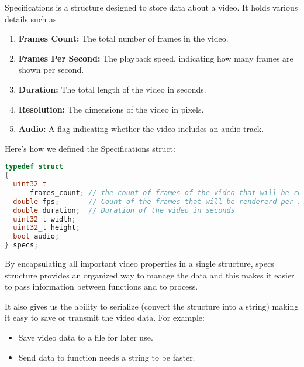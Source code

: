 \documentclass[a4paper,12pt]{article}
\begin{document}
Specifications is a structure designed to store data about a video. It holds various details such as

\begin{enumerate}
    \item \textbf{Frames Count:} The total number of frames in the video.
    \item \textbf{Frames Per Second:} The playback speed, indicating how many frames are shown per second.
    \item \textbf{Duration:} The total length of the video in seconds.
    \item \textbf{Resolution:} The dimensions of the video in pixels.
    \item \textbf{Audio:} A flag indicating whether the video includes an audio track.
\end{enumerate}

Here's how we defined the Specifications struct:
\begin{lstlisting}[language=c]
typedef struct
{
  uint32_t
      frames_count; // the count of frames of the video that will be rendererd
  double fps;       // Count of the frames that will be rendererd per second
  double duration;  // Duration of the video in seconds
  uint32_t width;
  uint32_t height;
  bool audio;
} specs;
\end{lstlisting}

By encapsulating all important video properties in a single structure, specs structure provides an organized way to manage the data and this makes it easier to pass information between functions and to process.

It also gives us the ability to serialize (convert the structure into a string) making it easy to save or transmit the video data. For example:
\begin{itemize}
    \item Save video data to a file for later use.
    \item Send data to function needs a string to be faster.
\end{itemize}
\end{document}
